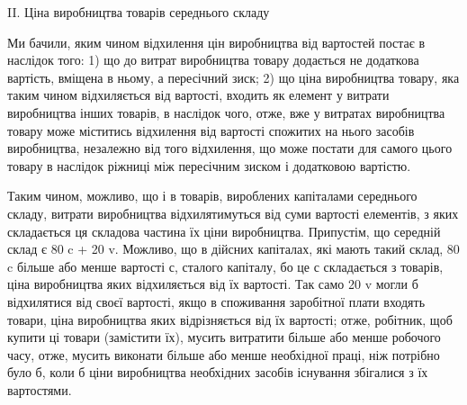 II. Ціна виробництва товарів середнього складу

       Ми бачили, яким чином відхилення цін виробництва від вартостей постає в наслідок того:
       1) що до витрат виробництва товару додається не додаткова вартість, вміщена в ньому, а
пересічний зиск;
       2) що ціна виробництва товару, яка таким чином відхиляється від вартості, входить як елемент
у витрати виробництва інших товарів, в наслідок чого, отже, вже у витратах виробництва товару може
міститись відхилення від вартості спожитих на нього засобів виробництва, незалежно від того
відхилення, що може постати для самого цього товару в наслідок ріжниці між пересічним зиском і
додатковою вартістю.

Таким чином, можливо, що і в товарів, вироблених капіталами середнього складу, витрати виробництва
відхилятимуться від суми вартості елементів, з яких складається ця складова частина їх ціни
виробництва. Припустім, що середній склад є 80 c + 20 v. Можливо, що в дійсних капіталах, які мають
такий склад, 80  c більше або менше вартості с, сталого капіталу, бо це с складається з товарів,
ціна виробництва яких відхиляється від їх вартості. Так само 20 v  могли б відхилятися від своєї
вартості, якщо в споживання заробітної плати входять товари, ціна виробництва яких відрізняється від
їх вартості; отже, робітник, щоб купити ці товари (замістити їх), мусить витратити більше або менше
робочого часу, отже, мусить виконати більше або менше необхідної праці, ніж потрібно було б, коли б
ціни виробництва
необхідних засобів існування збігалися з їх вартостями.

